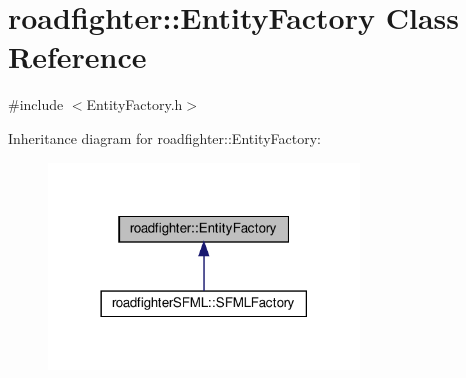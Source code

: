 \hypertarget{classroadfighter_1_1EntityFactory}{}\section{roadfighter\+:\+:Entity\+Factory Class Reference}
\label{classroadfighter_1_1EntityFactory}


{\ttfamily \#include $<$Entity\+Factory.\+h$>$}



Inheritance diagram for roadfighter\+:\+:Entity\+Factory\+:\nopagebreak
\begin{figure}[H]
\begin{center}
\leavevmode
\includegraphics[width=234pt]{classroadfighter_1_1EntityFactory__inherit__graph}
\end{center}
\end{figure}
